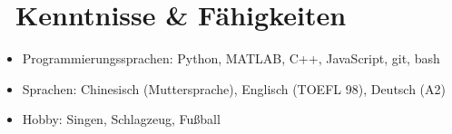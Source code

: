 \documentclass{resume}
\begin{document}


\section{\faCogs\ Kenntnisse \& Fähigkeiten}

\begin{itemize}[parsep=0.5ex]
  \item Programmierungssprachen: Python, MATLAB, C++, JavaScript, git, bash
  \item Sprachen: Chinesisch (Muttersprache), Englisch (TOEFL 98), Deutsch (A2)
  \item Hobby: Singen, Schlagzeug, Fußball
\end{itemize}
\end{document}
